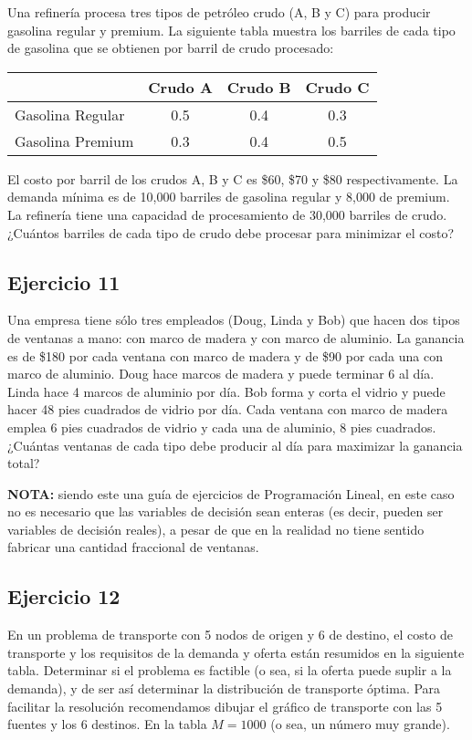 \documentclass[12pt]{article}
\begin{document}
Una refinería procesa tres tipos de petróleo crudo (A, B y C) para producir gasolina regular y premium. La siguiente tabla muestra los barriles de cada tipo de gasolina que se obtienen por barril de crudo procesado:

\begin{center}
\begin{tabular}{lccc}
\toprule
& Crudo A & Crudo B & Crudo C \\
\midrule
Gasolina Regular & 0.5 & 0.4 & 0.3 \\
Gasolina Premium & 0.3 & 0.4 & 0.5 \\
\bottomrule
\end{tabular}
\end{center}

El costo por barril de los crudos A, B y C es \$60, \$70 y \$80 respectivamente. La demanda mínima es de 10,000 barriles de gasolina regular y 8,000 de premium. La refinería tiene una capacidad de procesamiento de 30,000 barriles de crudo. ¿Cuántos barriles de cada tipo de crudo debe procesar para minimizar el costo?

\subsection*{Ejercicio 11}

Una empresa tiene sólo tres empleados (Doug, Linda y Bob) que hacen dos tipos de ventanas a mano: con marco de madera y con marco de aluminio. La ganancia es de \$180 por cada ventana con marco de madera y de \$90 por cada una con marco de aluminio. Doug hace marcos de madera y puede terminar 6 al día. Linda hace 4 marcos de aluminio por día. Bob forma y corta el vidrio y puede hacer 48 pies cuadrados de vidrio por día. Cada ventana con marco de madera emplea 6 pies cuadrados de vidrio y cada una de aluminio, 8 pies cuadrados. ¿Cuántas ventanas de cada tipo debe producir al día para maximizar la ganancia total?

\textbf{NOTA:} siendo este una guía de ejercicios de Programación Lineal, en este caso no es necesario que las variables de decisión sean enteras (es decir, pueden ser variables de decisión reales), a pesar de que en la realidad no tiene sentido fabricar una cantidad fraccional de ventanas.

\subsection*{Ejercicio 12}

En un problema de transporte con 5 nodos de origen y 6 de destino, el costo de transporte y los requisitos de la demanda y oferta están resumidos en la siguiente tabla. Determinar si el problema es factible (o sea, si la oferta puede suplir a la demanda), y de ser así determinar la distribución de transporte óptima. Para facilitar la resolución recomendamos dibujar el gráfico de transporte con las 5 fuentes y los 6 destinos. En la tabla \(M = 1000\) (o sea, un número muy grande).
\end{document}
